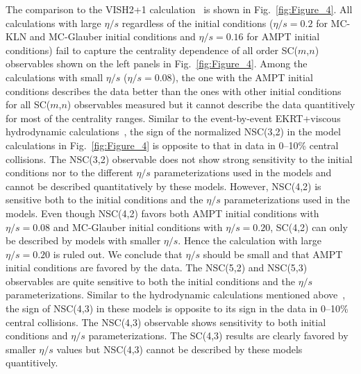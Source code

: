 The comparison to the VISH2+1 calculation~\cite{Zhu:2016puf} is shown in Fig.~\ref{fig:Figure_4}.  All calculations with large $\eta/s$ regardless of the initial conditions ($\eta/s=0.2$ for MC-KLN and MC-Glauber initial conditions and $\eta/s=0.16$ for AMPT initial conditions) fail to capture the centrality dependence of all order SC($m$,$n$) observables shown on the left panels in Fig.~\ref{fig:Figure_4}.
Among the calculations with small $\eta/s$ ($\eta/s=0.08$), the one with the AMPT initial conditions describes the data better than the ones with other initial conditions for all SC($m$,$n$) observables measured but it cannot describe the data quantitively for most of the centrality ranges.
Similar to the event-by-event EKRT+viscous hydrodynamic calculations~\cite{Niemi:2015qia}, the sign of the normalized NSC(3,2) in the model calculations in Fig.~\ref{fig:Figure_4} is opposite to that in data in 0--10\% central collisions. The NSC(3,2) observable does not show strong sensitivity to the initial conditions nor to the different $\eta/s$ parameterizations used in the models and cannot be described quantitatively by these models.
However, NSC(4,2) is sensitive both to the initial conditions and the $\eta/s$ parameterizations used in the models.
Even though NSC(4,2) favors both AMPT initial conditions with $\eta/s=0.08$ and MC-Glauber initial conditions with $\eta/s=0.20$,
SC(4,2) can only be described by models with smaller $\eta/s$. Hence the calculation with large $\eta/s=0.20$ is ruled out. We conclude that $\eta/s$ should be small and that AMPT initial conditions are favored by the data.
The NSC(5,2) and NSC(5,3) observables are quite sensitive to both the initial conditions and the $\eta/s$ parameterizations.
Similar to the hydrodynamic calculations mentioned above~\cite{Niemi:2015qia}, the sign of NSC(4,3) in these models is opposite to its sign in the data in 0--10\% central collisions. The NSC(4,3) observable shows sensitivity to both initial conditions and $\eta/s$ parameterizations.
The SC(4,3) results are clearly favored by smaller $\eta/s$ values but NSC(4,3) cannot be described by these models quantitively.

